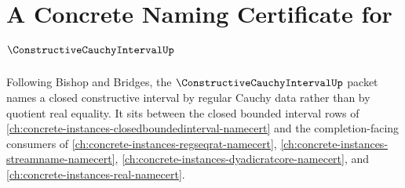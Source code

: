 \chapter{A Concrete Naming Certificate for $\ConstructiveCauchyIntervalUp$}
\label{ch:concrete-instances-constructive-cauchy-interval-namecert}

Following Bishop and Bridges, the $\ConstructiveCauchyIntervalUp$ packet names a closed constructive interval by regular Cauchy data rather than by quotient real equality. It sits between the closed bounded interval rows of \autoref{ch:concrete-instances-closedboundedinterval-namecert} and the completion-facing consumers of \autoref{ch:concrete-instances-regseqrat-namecert}, \autoref{ch:concrete-instances-streamname-namecert}, \autoref{ch:concrete-instances-dyadicratcore-namecert}, and \autoref{ch:concrete-instances-real-namecert}.


